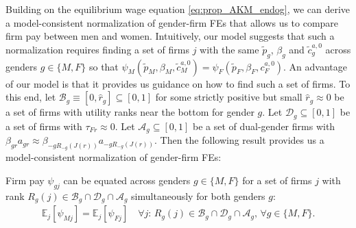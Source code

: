 Building on the equilibrium wage equation \eqref{eq:prop_AKM_endog}, we can derive a model-consistent normalization of gender-firm FEs that allows us to compare firm pay between men and women. Intuitively, our model suggests that such a normalization requires finding a set of firms $j$ with the same $\tilde{p}_{g}$, $\beta_{g}$ and $\tilde{c}_{g}^{a,0}$ across genders $g \in \{ M, F \}$ so that $\psi_{M}(\tilde{p}_{M}, \beta_{M}, \tilde{c}_{M}^{a,0}) = \psi_{F}(\tilde{p}_{F}, \beta_{F}, c_{F}^{a,0})$. An advantage of our model is that it provides us guidance on how to find such a set of firms. To this end, let $\mathcal{B}_{g} \equiv [0, \hat{r}_{g}] \subseteq [0, 1]$ for some strictly positive but small $\hat{r}_{g} \approx 0$ be a set of firms with utility ranks near the bottom for gender $g$. Let $\mathcal{D}_{g} \subseteq [0,1]$ be a set of firms with $\tau_{Fr} \approx 0$. Let $\mathcal{A}_{g} \subseteq [0,1]$ be a set of dual-gender firms with $\beta_{gr} a_{gr} \approx \beta_{-gR_{-g}(J(r))} a_{-gR_{-g}(J(r))}$. Then the following result provides us a model-consistent normalization of gender-firm FEs:
%
\newcommand{\PropFirmPayNorm}{%
    Firm pay $\psi_{gj}$ can be equated across genders $g \in \{ M, F \}$ for a set of firms $j$ with rank $R_{g}(j) \in \mathcal{B}_{g} \cap \mathcal{D}_{g} \cap \mathcal{A}_{g}$ simultaneously for both genders $g$:
    \begin{align}
        \mathbb{E}_{j}[\psi_{Mj}] = \mathbb{E}_{j}[\psi_{Fj}] \quad \forall j: \, R_{g}(j) \in \mathcal{B}_{g} \cap \mathcal{D}_{g} \cap \mathcal{A}_{g}, \, \forall g \in \{ M, F \}. \label{eq:normalization_endog}
    \end{align}
}
%
\begin{proposition}
    \label{prop:firm_pay_norm}
    \PropFirmPayNorm
\end{proposition}
%

